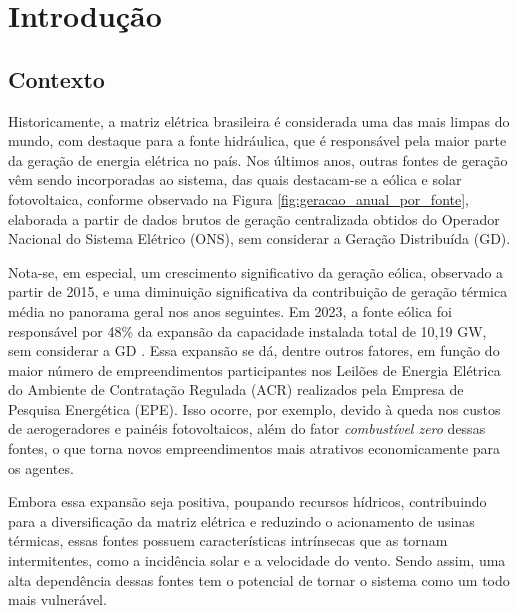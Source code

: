 \chapter{Introdução}
\sloppy																													%

\section{Contexto}
Historicamente, a matriz elétrica brasileira é considerada uma das mais limpas do mundo, com destaque para a fonte
hidráulica, que é responsável pela maior parte da geração de energia elétrica no país. Nos últimos anos, outras fontes
de geração vêm sendo incorporadas ao sistema, das quais destacam-se a eólica e solar fotovoltaica, conforme observado na
Figura \ref{fig:geracao_anual_por_fonte}, elaborada a partir de dados brutos de geração centralizada obtidos do Operador
Nacional do Sistema Elétrico (ONS), sem considerar a Geração Distribuída (GD).

\begin{figure}[!ht]
	{}
	{}
\end{figure}

Nota-se, em especial, um crescimento significativo da geração eólica, observado a partir de 2015, e uma diminuição 
significativa da contribuição de geração térmica média no panorama geral nos anos seguintes. Em 2023, a fonte eólica 
foi responsável por 48\% da expansão da capacidade instalada total de 10,19 GW, sem considerar a GD \cite{EPE2024}. Essa expansão
se dá, dentre outros fatores, em função do maior número de empreendimentos participantes nos Leilões de Energia Elétrica do 
Ambiente de Contratação Regulada (ACR) realizados pela Empresa de Pesquisa Energética (EPE). Isso ocorre, por exemplo,
devido à queda nos custos de aerogeradores e painéis fotovoltaicos, além do fator \textit{combustível zero} dessas fontes, o que torna novos 
empreendimentos mais atrativos economicamente para os agentes.

Embora essa expansão seja positiva, poupando recursos hídricos, contribuindo para a diversificação da matriz elétrica e
reduzindo o acionamento de usinas térmicas, essas fontes possuem características intrínsecas que as tornam intermitentes,
como a incidência solar e a velocidade do vento. Sendo assim, uma alta dependência dessas fontes tem o potencial
de tornar o sistema como um todo mais vulnerável.

